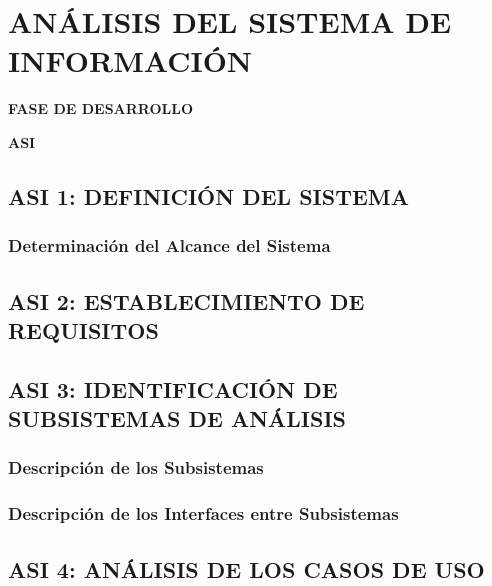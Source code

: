 \newpage
\chapter{ANÁLISIS DEL SISTEMA DE INFORMACIÓN}
	\vspace{2cm}	
	\begin{center}
	{\Large \textbf{FASE DE DESARROLLO} \par}
	\end{center}
	\vspace{5cm}
	
	\begin{center}
	\Huge \textbf{ASI}\par
	\end{center}

\newpage
\section{ASI 1: DEFINICIÓN DEL SISTEMA}

\subsection{Determinación del Alcance del Sistema}



\newpage
\section{ASI 2: ESTABLECIMIENTO DE REQUISITOS}




\newpage
\section{ASI 3: IDENTIFICACIÓN DE SUBSISTEMAS DE ANÁLISIS}

\subsection{Descripción de los Subsistemas} 

\subsection{Descripción de los Interfaces entre Subsistemas}


\newpage
\section{ASI 4: ANÁLISIS DE LOS CASOS DE USO}



